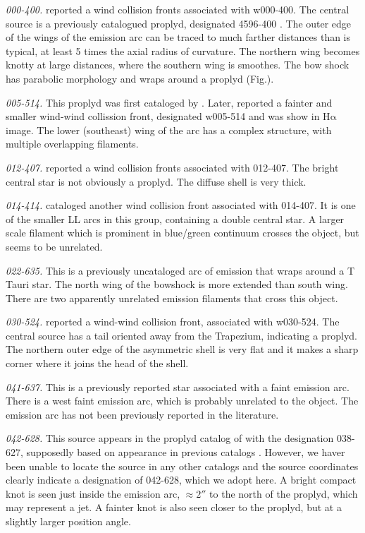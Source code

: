 \documentclass[iop, apj]{emulateapj}
\newcommand\ha{\ensuremath{\mathrm{H\alpha}}}
\begin{document}
\textit{000-400.} \citet{Bally:2000a} reported a wind collision fronts associated with w000-400. The central source is a previously catalogued proplyd, designated 4596-400 \citep{Ricci:2008a}. The outer edge of the wings of the emission arc can be traced to much farther distances than is typical, at least 5 times the axial radius of curvature. The northern wing becomes knotty at large distances, where  the southern wing is smoothes. The bow shock has parabolic morphology and wraps around a proplyd (Fig.).   

\textit{005-514.} This proplyd was first cataloged by \citet{ODell:1996a}. Later, \citet{Bally:2000a} reported a fainter and smaller wind-wind collission front, designated w005-514 and was show in \ha{} image. The lower (southeast) wing of the arc has a complex structure, with multiple overlapping filaments.

\textit{012-407.} \citet{Bally:2000a} reported a wind collision fronts associated with 012-407. The bright central star is not obviously a proplyd. The diffuse shell is very thick.  

\textit{014-414.} \citet{Bally:2000a} cataloged another wind collision front associated with 014-407. It is one of the smaller LL arcs in this group, containing a double central star. A larger scale filament which is prominent in blue/green continuum crosses the object, but seems to be unrelated. 

\textit{022-635.} This is a previously uncataloged arc of emission that wraps around a T Tauri star. The north wing of the bowshock is more extended than south wing. There are two apparently unrelated emission filaments that cross this object. 

\textit{030-524.} \citet{Bally:2000a} reported a wind-wind collision front, associated with w030-524. The central source has a tail oriented away from the Trapezium, indicating a proplyd. The northern outer edge of the asymmetric shell is very flat and it makes a sharp corner where it joins the head of the shell.

\textit{041-637.} This is a previously reported star \citep{Da-Rio:2009a} associated with a faint emission arc. There is a west faint emission arc, which is probably unrelated to the object. The emission arc has not been previously reported in the literature.

\textit{042-628.} This source appears in the proplyd catalog of
\citet{Ricci:2008a} with the designation 038-627, supposedly based on
appearance in previous catalogs \citep{ODell:1996a}. However, we haver
been unable to locate the source in any other catalogs and the source
coordinates clearly indicate a designation of 042-628, which we adopt
here.  A bright compact knot is seen just inside the emission arc,
\(\approx 2''\) to the north of the proplyd, which may represent a
jet.  A fainter knot is also seen closer to the proplyd, but at a
slightly larger position angle.
\end{document}
